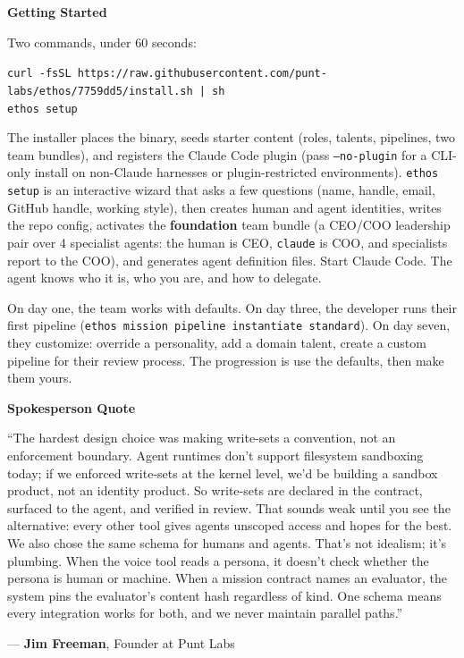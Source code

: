 \documentclass[11pt,letterpaper]{article}
\newcommand{\prsection}[1]{%
  \vspace{1em}%
  {\large\bfseries\color{SectionBlue}#1}%
  \vspace{0.3em}\par%
}
\begin{document}
\prsection{Getting Started}

Two commands, under 60 seconds:

{\small\texttt{curl -fsSL https://raw.githubusercontent.com/punt-labs/ethos/7759dd5/install.sh | sh}} \\
{\small\texttt{ethos setup}}

\noindent The installer places the binary, seeds starter content (roles, talents, pipelines, two team bundles), and registers the Claude Code plugin (pass {\small\texttt{--no-plugin}} for a CLI-only install on non-Claude harnesses or plugin-restricted environments). {\small\texttt{ethos setup}} is an interactive wizard that asks a few questions (name, handle, email, GitHub handle, working style), then creates human and agent identities, writes the repo config, activates the \textbf{foundation} team bundle (a CEO/COO leadership pair over 4 specialist agents: the human is CEO, {\small\texttt{claude}} is COO, and specialists report to the COO), and generates agent definition files. Start Claude Code. The agent knows who it is, who you are, and how to delegate.

On day one, the team works with defaults. On day three, the developer runs their first pipeline ({\small\texttt{ethos mission pipeline instantiate standard}}). On day seven, they customize: override a personality, add a domain talent, create a custom pipeline for their review process. The progression is use the defaults, then make them yours.

\prsection{Spokesperson Quote}

\begin{spokespersonquote}
``The hardest design choice was making write-sets a convention, not an enforcement boundary. Agent runtimes don't support filesystem sandboxing today; if we enforced write-sets at the kernel level, we'd be building a sandbox product, not an identity product. So write-sets are declared in the contract, surfaced to the agent, and verified in review. That sounds weak until you see the alternative: every other tool gives agents unscoped access and hopes for the best. We also chose the same schema for humans and agents. That's not idealism; it's plumbing. When the voice tool reads a persona, it doesn't check whether the persona is human or machine. When a mission contract names an evaluator, the system pins the evaluator's content hash regardless of kind. One schema means every integration works for both, and we never maintain parallel paths.''

\raggedleft --- \textbf{Jim Freeman}, Founder at Punt Labs
\end{spokespersonquote}
\end{document}
